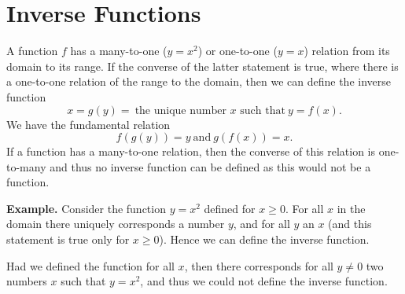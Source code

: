 \chapter*{Inverse Functions}
A function $f$ has a many-to-one ($y = x^2$) or one-to-one ($y = x$) relation from its domain to its range. If the converse of the latter statement is true, where there is a one-to-one relation of the range to the domain, then we can define the inverse function
\[x = g(y) =\: \text{the unique number $x$ such that}\: y = f(x).\]
We have the fundamental relation
\[f(g(y)) = y\: \text{and}\: g(f(x)) = x.\]
If a function has a many-to-one relation, then the converse of this relation is one-to-many and thus no inverse function can be defined as this would not be a function.

\textbf{Example.} Consider the function $y = x^2$ defined for $x \ge 0$. For all $x$ in the domain there uniquely corresponds a number $y$, and for all $y$ an $x$ (and this statement is true only for $x \ge 0$). Hence we can define the inverse function.

Had we defined the function for all $x$, then there corresponds for all $y \ne 0$ two numbers $x$ such that $y = x^2$, and thus we could not define the inverse function.
